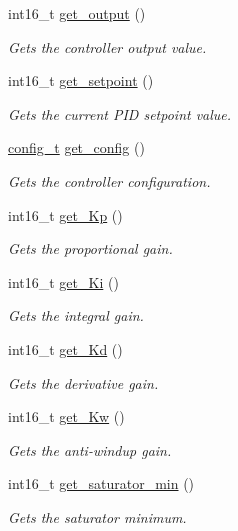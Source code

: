 \begin{DoxyCompactItemize}
int16\-\_\-t \hyperlink{classpid_a76cf4bd65ac9eabbcc8966b9bc11856f}{get\-\_\-output} ()
\begin{DoxyCompactList}\small\item\em Gets the controller output value. \end{DoxyCompactList}\item 
int16\-\_\-t \hyperlink{classpid_a931b4c277b03a558f60719d98cec617e}{get\-\_\-setpoint} ()
\begin{DoxyCompactList}\small\item\em Gets the current P\-I\-D setpoint value. \end{DoxyCompactList}\item 
\hyperlink{classpid_a13d711458f38f6f9e39baa39a6353a1f}{config\-\_\-t} \hyperlink{classpid_a5e72d4cd6300ef299bb0472b596003c0}{get\-\_\-config} ()
\begin{DoxyCompactList}\small\item\em Gets the controller configuration. \end{DoxyCompactList}\item 
int16\-\_\-t \hyperlink{classpid_aeb1df91805eb236df24ca9b09273dc83}{get\-\_\-\-Kp} ()
\begin{DoxyCompactList}\small\item\em Gets the proportional gain. \end{DoxyCompactList}\item 
int16\-\_\-t \hyperlink{classpid_a771503b4f0b63aa2a08a95513b66f519}{get\-\_\-\-Ki} ()
\begin{DoxyCompactList}\small\item\em Gets the integral gain. \end{DoxyCompactList}\item 
int16\-\_\-t \hyperlink{classpid_af02d787d3cb2dbb650a0c00235eb2cfd}{get\-\_\-\-Kd} ()
\begin{DoxyCompactList}\small\item\em Gets the derivative gain. \end{DoxyCompactList}\item 
int16\-\_\-t \hyperlink{classpid_a64cef8db32b82baded7a1444976d60ba}{get\-\_\-\-Kw} ()
\begin{DoxyCompactList}\small\item\em Gets the anti-\/windup gain. \end{DoxyCompactList}\item 
int16\-\_\-t \hyperlink{classpid_a1b4d0f306e84ac160ba79cebba739464}{get\-\_\-saturator\-\_\-min} ()
\begin{DoxyCompactList}\small\item\em Gets the saturator minimum. \end{DoxyCompactList}\item 

\end{DoxyCompactItemize}
